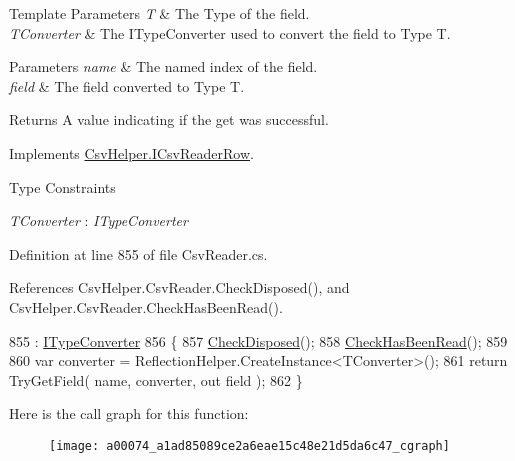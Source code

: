 \begin{DoxyTemplParams}{Template Parameters}
{\em T} & The Type of the field.\\
\hline
{\em T\-Converter} & The I\-Type\-Converter used to convert the field to Type T.\\
\hline
\end{DoxyTemplParams}

\begin{DoxyParams}{Parameters}
{\em name} & The named index of the field.\\
\hline
{\em field} & The field converted to Type T.\\
\hline
\end{DoxyParams}
\begin{DoxyReturn}{Returns}
A value indicating if the get was successful.
\end{DoxyReturn}


Implements \hyperlink{a00110_a9bd7b721a7b4acbc21050817aca71f21}{Csv\-Helper.\-I\-Csv\-Reader\-Row}.

\begin{Desc}
\item[Type Constraints]\begin{description}
\item[{\em T\-Converter} : {\em I\-Type\-Converter}]\end{description}
\end{Desc}


Definition at line 855 of file Csv\-Reader.\-cs.



References Csv\-Helper.\-Csv\-Reader.\-Check\-Disposed(), and Csv\-Helper.\-Csv\-Reader.\-Check\-Has\-Been\-Read().


\begin{DoxyCode}
855                                                                                                     : 
      \hyperlink{a00117}{ITypeConverter}
856         \{
857             \hyperlink{a00074_a6fa45a46ed1322dc1872ca2321b5edbc}{CheckDisposed}();
858             \hyperlink{a00074_a2d9249171ed1568e45d152766d364c31}{CheckHasBeenRead}();
859 
860             var converter = ReflectionHelper.CreateInstance<TConverter>();
861             \textcolor{keywordflow}{return} TryGetField( name, converter, out field );
862         \}
\end{DoxyCode}


Here is the call graph for this function\-:
\nopagebreak
\begin{figure}[H]
\begin{center}
\leavevmode
\texttt{[image: a00074\_a1ad85089ce2a6eae15c48e21d5da6c47\_cgraph]}
\end{center}
\end{figure}


